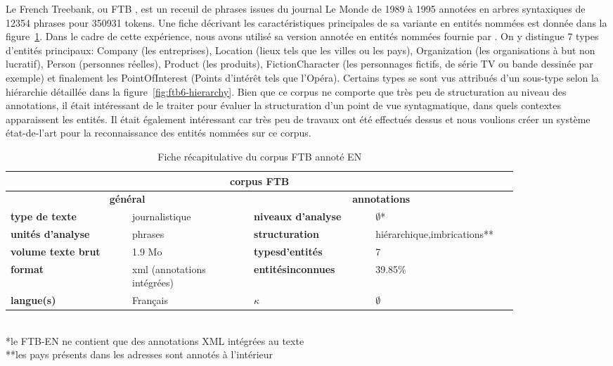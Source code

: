 \documentclass[PhD-Yoann-Dupont.tex]{subfiles}
\begin{document}
Le French Treebank, ou FTB \citep{Abeille03}, est un receuil de phrases issues du journal Le Monde de 1989 à 1995 annotées en arbres syntaxiques de 12354 phrases pour 350931 tokens. Une fiche décrivant les caractéristiques principales de sa variante en entités nommées est donnée dans la figure\ \ref{tab:FTB-recap-card}. Dans le cadre de cette expérience, nous avons utilisé sa version annotée en entités nommées fournie par \citet{sagot2012annotation}. On y distingue 7 types d'entités principaux: Company (les entreprises), Location (lieux tels que les villes ou les pays), Organization (les organisations à but non lucratif), Person (personnes réelles), Product (les produits), FictionCharacter (les personnages fictifs, de série TV ou bande dessinée par exemple) et finalement les PointOfInterest (Points d'intérêt tels que l'Opéra). Certains types se sont vus attribués d'un sous-type selon la hiérarchie détaillée dans la figure\ \ref{fig:ftb6-hierarchy}. Bien que ce corpus ne comporte que très peu de structuration au niveau des annotations, il était intéressant de le traiter pour évaluer la structuration d'un point de vue syntagmatique, dans quels contextes apparaissent les entités. Il était également intéressant car très peu de travaux ont été effectués dessus et nous voulions créer un système état-de-l'art pour la reconnaissance des entités nommées sur ce corpus.

\begin{table}[ht!]
\centering
\begin{tabular}{|p{0.21\linewidth}|p{0.21\linewidth}|p{0.21\linewidth}|p{0.21\linewidth}|}
\hline
\multicolumn{4}{|c|}{\textbf{corpus FTB}} \\
\hline
\multicolumn{2}{|c|}{\textbf{général}} & \multicolumn{2}{c|}{\textbf{annotations}} \\
\hline
\textbf{type de texte} & journalistique & \textbf{niveaux d'analyse} & $\emptyset$* \\
\hline
\textbf{unités d'analyse} & phrases & \textbf{structuration} & hiérarchique,\newline imbrications** \\
\hline
\textbf{volume texte brut} & 1.9 Mo & \textbf{types\newline d'entités} & 7 \\
\hline
\textbf{format} & xml (annotations intégrées) & \textbf{entités\newline inconnues} & 39.85\% \\
\hline
\textbf{langue(s)} & Français & \textbf{$\kappa$} & $\emptyset$ \\
\hline
\end{tabular}
\scriptsize{\\ *le FTB-EN ne contient que des annotations XML intégrées au texte}
\scriptsize{\\ **les pays présents dans les adresses sont annotés à l'intérieur}
\caption{Fiche récapitulative du corpus FTB annoté EN}
\label{tab:FTB-recap-card}
\end{table}
\end{document}
